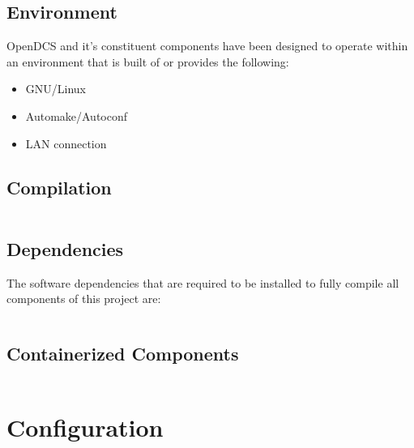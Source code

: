 \documentclass[11pt]{article}
\begin{document}
    \subsection{Environment}\label{sec:inst-env}

      OpenDCS and it's constituent components have been designed to operate
      within an environment that is built of or provides the following:

      \begin{itemize}
        \item GNU/Linux
        \item Automake/Autoconf
        \item LAN connection
      \end{itemize}

    \subsection{Compilation}\label{sec:inst-comp}

      \begin{lstlisting}[caption={},label={}]
      \end{lstlisting}

    \subsection{Dependencies}\label{sec:inst-dep}

      The software dependencies that are required to be installed to fully
      compile all components of this project are:

      \begin{itemize}
      \end{itemize}

      \begin{lstlisting}[caption={},label={}]
      \end{lstlisting}

    \subsection{Containerized Components}\label{sec:inst-cont}

      \begin{lstlisting}[caption={},label={}]
      \end{lstlisting}

  \section{Configuration}\label{sec:cfg}
\end{document}
